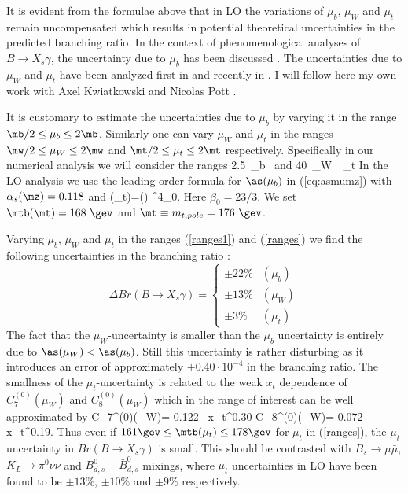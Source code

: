 It is evident from the formulae above that in LO the variations of
$\mu_b$, $\mu_W$ and $\mu_t$ remain uncompensated which results
in potential theoretical uncertainties in the predicted branching
ratio.
  In the context of phenomenological analyses of $B \to X_s\gamma$,
the uncertainty due to $\mu_b$ has been discussed
\cite{AG1,BMMP:94,CZMM,GREUB,BKP1}. The
uncertainties due to $\mu_W$
and $\mu_t$ have been analyzed first in \cite{BKP1} and 
recently in \cite{BG98}. I will follow here my own work with
Axel Kwiatkowski and Nicolas Pott \cite{BKP1}.

\noindent
It is customary to estimate the uncertainties due to $\mu_b$ by
varying it in the range $\mb/2\le\mu_b\le 2\mb$. Similarly one
can vary $\mu_W$ and $\mu_t$ in the ranges $\mw/2\le\mu_W\le 2\mw$
and $\mt/2\le\mu_t\le 2\mt$ respectively. Specifically in our
numerical analysis we will consider the ranges
\be\label{ranges1}
2.5~\gev\le\mu_b~\gev
\ee
and
\be\label{ranges}
40~\gev\le\mu_W~\gev{}~\gev\le \mu_t\gev
\ee
In the LO analysis we use the leading order formula for
$\as(\mu_b)$ in (\ref{eq:asmumz})
with $\alpha_s(\mz)=0.118$ and
\be\label{mbar}
\mtb(\mu_t)=\mtb(\mt)
\left[\f{\as(\mu_t)}{\as(\mt)}\right]^{\f{4}{\beta_0}}.
\ee
Here $\beta_0=23/3$.
We set $\mtb(\mt)=168~\gev$
and $\mt\equiv m_{t,pole}=176~\gev$.

\noindent
Varying $\mu_b$, $\mu_W$ and $\mu_t$ in the ranges (\ref{ranges1})
and (\ref{ranges})  we
find the following  uncertainties in the branching
ratio \cite{BKP1}:
\begin{equation}\label{LOmu1}
\Delta Br(B\to X_s \gamma)=\left\{ \begin{array}{ll}
\pm 22\% & (\mu_b) \\
\pm 13\% & (\mu_W) \\
\pm 3 \% & (\mu_t) \end{array} \right.
\end{equation}
The fact that the $\mu_W$-uncertainty is smaller than
the $\mu_b$ uncertainty is entirely due to $\as(\mu_W)<\as(\mu_b)$. 
Still this uncertainty is rather disturbing as it introduces an error of
approximately $\pm 0.40\cdot 10^{-4}$ in the branching ratio.
The
smallness of the $\mu_t$-uncertainty is related to the weak $x_t$
dependence of $C_{7}^{(0)}(\mu_W)$ and  $C_{8}^{(0)}(\mu_W)$
which in the range of interest can be well approximated by
\be
C_{7}^{(0)}(\mu_W)=-0.122~ x_t^{0.30}
\qquad  C_{8}^{(0)}(\mu_W)=-0.072~ x_t^{0.19}.
\ee
Thus even if $161\gev\le\mtb(\mu_t)\le 178\gev$ for $\mu_t$ in 
(\ref{ranges}),
the $\mu_t$ uncertainty in  $Br(B\to X_s \gamma)$ is small.
This should be contrasted with  $B_s\to\mu\bar\mu$,
$K_L\to\pi^0\nu\bar\nu$ and $ B_{d,s}^0-\bar B_{d,s}^0$ mixings, 
where $\mu_t$ uncertainties in LO have been
found \cite{BB2,BJW90} to be $\pm 13\%$, $\pm 10\%$ and $\pm 9\%$ 
respectively.

